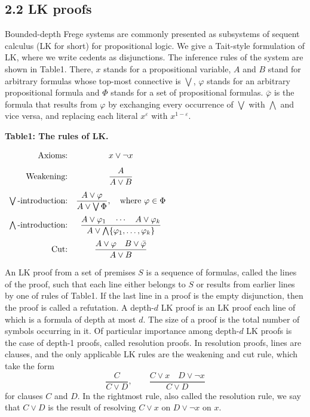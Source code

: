 \documentclass[10pt,a4paper]{article}
\begin{document}
\subsection*{2.2 LK proofs}
Bounded-depth Frege systems are commonly presented as subsystems of sequent calculus (LK for short) for propositional logic. We give a Tait-style formulation of LK, where we write cedents as disjunctions. The inference rules of the system are shown in Table1. There, $x$ stands for a propositional variable, $A$ and $B$ stand for arbitrary formulas whose top-most connective is $\bigvee$, $\varphi$ stands for an arbitrary propositional formula and $\Phi$ stands for a set of propositional formulas. $\bar\varphi$ is the formula that results from $\varphi$ by exchanging every occurrence of $\bigvee$ with $\bigwedge$ and vice versa, and replacing each literal $x^\varepsilon$ with $x^{1-\varepsilon}$.
\begin{center}\textbf{Table1: The rules of LK.}\par\medskip
$\begin{array}{r@{\quad}c} \text{Axioms:}&x\vee\neg x\\[8pt]\text{Weakening:}&\dfrac{A}{A\vee B}\\[12pt]\bigvee\text{-introduction:}&\dfrac{A\vee\varphi}{A\vee\bigvee\Phi},\quad\text{where }\varphi\in\Phi\\[12pt]\bigwedge\text{-introduction:}&\dfrac{A\vee\varphi_1\quad\cdots\quad A\vee\varphi_k}{A\vee\bigwedge\{\varphi_1,\ldots,\varphi_k\}}\\[12pt]\text{Cut:}&\dfrac{A\vee\varphi\quad B\vee\bar\varphi}{A\vee B}\end{array}$\end{center}
An LK proof from a set of premises $S$ is a sequence of formulas, called the lines of the proof, such that each line either belongs to $S$ or results from earlier lines by one of rules of Table1. If the last line in a proof is the empty disjunction, then the proof is called a refutation. A depth-$d$ LK proof is an LK proof each line of which is a formula of depth at most $d$. The size of a proof is the total number of symbols occurring in it.
Of particular importance among depth-$d$ LK proofs is the case of depth-1 proofs, called resolution proofs. In resolution proofs, lines are clauses, and the only applicable LK rules are the weakening and cut rule, which take the form
\[\frac C{C\vee D},\qquad\frac{C\vee x\quad D\vee\neg x}{C\vee D}\]
for clauses $C$ and $D$. In the rightmost rule, also called the resolution rule, we say that $C\vee D$ is the result of resolving $C\vee x$ on $D\vee\neg x$ on $x$.
\end{document}
